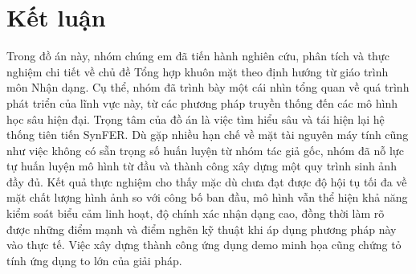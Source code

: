 \newpage
\section{Kết luận}

Trong đồ án này, nhóm chúng em đã tiến hành nghiên cứu, phân tích và thực nghiệm chi tiết về chủ đề Tổng hợp khuôn mặt theo định hướng từ giáo trình môn Nhận dạng. Cụ thể, nhóm đã trình bày một cái nhìn tổng quan về quá trình phát triển của lĩnh vực này, từ các phương pháp truyền thống đến các mô hình học sâu hiện đại. Trọng tâm của đồ án là việc tìm hiểu sâu và tái hiện lại hệ thống tiên tiến SynFER. Dù gặp nhiều hạn chế về mặt tài nguyên máy tính cũng như việc không có sẵn trọng số huấn luyện từ nhóm tác giả gốc, nhóm đã nỗ lực tự huấn luyện mô hình từ đầu và thành công xây dựng một quy trình sinh ảnh đầy đủ. Kết quả thực nghiệm cho thấy mặc dù chưa đạt được độ hội tụ tối đa về mặt chất lượng hình ảnh so với công bố ban đầu, mô hình vẫn thể hiện khả năng kiểm soát biểu cảm linh hoạt, độ chính xác nhận dạng cao, đồng thời làm rõ được những điểm mạnh và điểm nghẽn kỹ thuật khi áp dụng phương pháp này vào thực tế. Việc xây dựng thành công ứng dụng demo minh họa cũng chứng tỏ tính ứng dụng to lớn của giải pháp.


